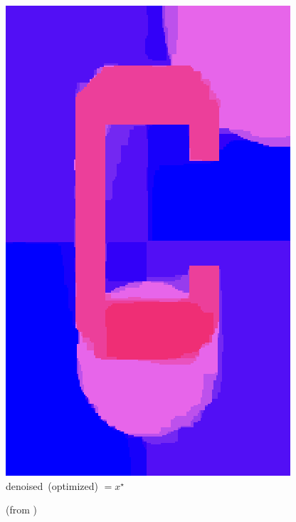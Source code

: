 \documentclass[12pt]{beamer}
\begin{document}
\begin{frame}
\begin{center}
\begin{minipage}[t]{0.2\textwidth}
\includegraphics[width=\textwidth]{c_denoised.png} \\
{\small \mbox{denoised (optimized)} $=x^\star$}
\end{minipage}
\mbox{\quad}
\end{center}
{\scriptsize (from \cite{ravikumar17}) \hfill}
\end{frame}
\end{document}
